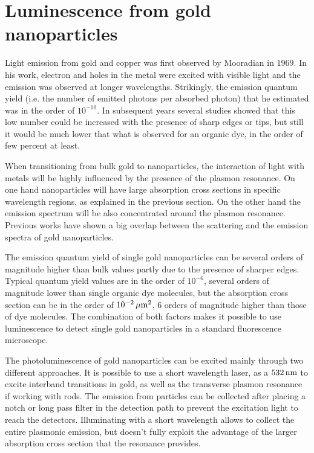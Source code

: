\section{Luminescence from gold nanoparticles}
\label{sec:luminescence}
Light emission from gold and copper was first observed by
Mooradian\cite{Mooradian1969} in $1969$. In his work, electron and holes in the
metal were excited with visible light and the emission was observed at longer
wavelengths. Strikingly, the emission quantum yield (i.e. the number of emitted
photons per absorbed photon) that he estimated was in the order of $10^{-10}$.
In subsequent years several studies showed that this low number could be
increased with the presence of sharp edges\cite{boyd1986photoinduced} or
tips\cite{Mohamed2000}, but still it would be much lower that what is observed
for an organic dye, in the order of few percent at least.

When transitioning from bulk gold to nanoparticles, the interaction of light
with metals will be highly influenced by the presence of the plasmon
resonance\cite{Dulkeith2004}. On one hand nanoparticles will have large
absorption cross sections in specific wavelength regions, as explained in the
previous section. On the other hand the emission spectrum will be also
concentrated around the plasmon resonance. Previous works have shown a big
overlap between the scattering and the emission spectra of gold nanoparticles.

The emission quantum yield of single gold nanoparticles can be several orders of
magnitude higher than bulk values partly due to the presence of sharper edges.
Typical quantum yield values are in the order of $10^{-6}$\cite{Yorulmaz2012},
several orders of magnitude lower than single organic dye molecules, but the
absorption cross section can be in the order of $10^{-2}\,\mu\textrm{m}^2$, $6$ orders of
magnitude higher than those of dye molecules. The combination of both factors
makes it possible to use luminescence to detect single gold nanoparticles in a
standard fluorescence microscope.

The photoluminescence of gold nanoparticles can be excited mainly through two
different approaches. It is possible to use a short wavelength laser, as a
$532\,\textrm{nm}$ to excite interband transitions in gold\cite{Beversluis2003a}, as well
as the transverse plasmon resonance if working with rods. The emission from
particles can be collected after placing a notch or long pass filter in the
detection path to prevent the excitation light to reach the detectors.
Illuminating with a short wavelength allows to collect the entire plasmonic
emission, but doesn't fully exploit the advantage of the larger absorption cross
section that the resonance provides.

